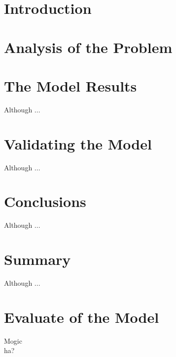 \section{Introduction}


\section{Analysis of the Problem}



\section{The Model Results}
Although ...


\section{Validating the Model}
Although ...


\section{Conclusions}
Although ...


\section{Summary}
Although ...


\section{Evaluate of the Model}
Mogic\\
ha?


